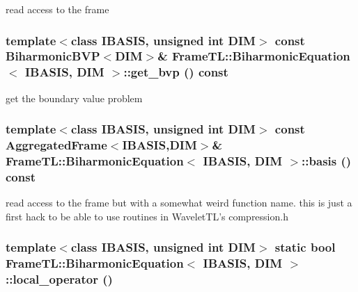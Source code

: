 read access to the frame \hypertarget{classFrameTL_1_1BiharmonicEquation_b688202abfc6f7d72a04dbf365ba6809}{
\subsubsection[get\_\-bvp]{\setlength{\rightskip}{0pt plus 5cm}template$<$class IBASIS, unsigned int DIM$>$ const BiharmonicBVP$<$DIM$>$\& {\bf FrameTL::BiharmonicEquation}$<$ IBASIS, DIM $>$::get\_\-bvp () const}}
\label{classFrameTL_1_1BiharmonicEquation_b688202abfc6f7d72a04dbf365ba6809}


get the boundary value problem \hypertarget{classFrameTL_1_1BiharmonicEquation_f197bfb03a8f123739a3311d803a1803}{
\subsubsection[basis]{\setlength{\rightskip}{0pt plus 5cm}template$<$class IBASIS, unsigned int DIM$>$ const {\bf AggregatedFrame}$<$IBASIS,DIM$>$\& {\bf FrameTL::BiharmonicEquation}$<$ IBASIS, DIM $>$::basis () const}}
\label{classFrameTL_1_1BiharmonicEquation_f197bfb03a8f123739a3311d803a1803}


read access to the frame but with a somewhat weird function name. this is just a first hack to be able to use routines in WaveletTL's compression.h \hypertarget{classFrameTL_1_1BiharmonicEquation_9d20dc4a94ba5719b1a25c92e8faba10}{
\subsubsection[local\_\-operator]{\setlength{\rightskip}{0pt plus 5cm}template$<$class IBASIS, unsigned int DIM$>$ static bool {\bf FrameTL::BiharmonicEquation}$<$ IBASIS, DIM $>$::local\_\-operator ()}}
\label{classFrameTL_1_1BiharmonicEquation_9d20dc4a94ba5719b1a25c92e8faba10}


